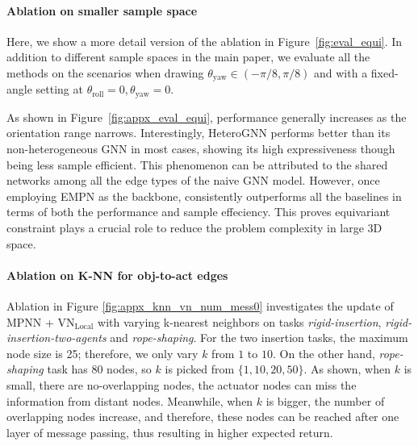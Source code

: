 
\paragraph{Ablation on smaller sample space}

Here, we show a more detail version of the ablation in Figure~\ref{fig:eval_equi}. In addition to different sample spaces in the main paper, we evaluate all the methods on the scenarios when drawing $\theta_{\text{yaw}} \in (-\pi/8, \pi/8)$ and with a fixed-angle setting at $\theta_{\text{roll}} = 0, \theta_{\text{yaw}} = 0$. 

As shown in Figure~\ref{fig:appx_eval_equi}, performance generally increases as the orientation range narrows. Interestingly, HeteroGNN performs better than its non-heterogeneous GNN in most cases, showing its high expressiveness though being less sample efficient. This phenomenon can be attributed to the shared networks among all the edge types of the naive GNN model. However, once employing EMPN as the backbone, \model consistently outperforms all the baselines in terms of both the performance and sample effeciency. This proves equivariant constraint plays a crucial role to reduce the problem complexity in large 3D space.

\paragraph{Ablation on K-NN for obj-to-act edges}



Ablation in Figure \ref{fig:appx_knn_vn_num_mess0} investigates the update of $\text{MPNN}$ + $\text{VN}_{\text {Local}} $ with varying k-nearest neighbors on tasks \textit{rigid-insertion}, \textit{rigid-insertion-two-agents} and \textit{rope-shaping}. For the two insertion tasks, the maximum node size is 25; therefore, we only vary $k$ from $1$ to $10$. On the other hand, \textit{rope-shaping} task has $80$ nodes, so $k$ is picked from $\{1, 10, 20, 50\}$. As shown, when $k$ is small, there are no-overlapping nodes, the actuator nodes can miss the information from distant nodes. Meanwhile, when $k$ is bigger, the number of overlapping nodes increase, and therefore, these nodes can be reached after one layer of message passing, thus resulting in higher expected return.



